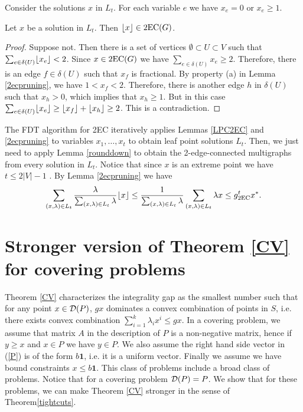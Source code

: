 \documentclass[runningheads]{llncs}
\begin{document}
Consider the solutions $x$ in $L_t$. For each variable $e$ we have $x_e=0$ or $x_e\geq 1$. 
\begin{lemma}\label{rounddown}
	Let $x$ be a solution in $L_t$. Then $\lfloor x\rfloor \in \operatorname{2EC}(G)$. 
\end{lemma}
\begin{proof}
	Suppose not. Then there is a set of vertices $\emptyset \subset U \subset V$ such that $\sum_{e\in \delta(U)}\lfloor x_e\rfloor<2$. Since $x\in \operatorname{2EC}(G)$ we have $\sum_{e\in \delta(U)}x_e \geq 2$. Therefore, there is an edge $f\in \delta(U)$ such that $x_f$ is fractional. By property (a) in Lemma \ref{2ecpruning}, we have $1<  x_f < 2$. Therefore, there is another edge $h$ in $\delta(U)$ such that $x_h>0$, which implies that $x_h\geq 1$. But in this case $\sum_{e\in \delta(U)}\lfloor x_e\rfloor\geq  \lfloor x_f\rfloor+\lfloor x_h\rfloor  \geq 2$. This is a contradiction.
\end{proof}

The FDT algorithm for 2EC iteratively applies Lemmas \ref{LPC2EC} and \ref{2ecpruning} to variables $x_1,\ldots,x_t$ to obtain leaf point solutions $L_t$. Then, we just need to apply Lemma \ref{rounddown} to obtain the 2-edge-connected multigraphs from every solution in $L_t$. Notice that since $x$ is an extreme point we have $t\leq 2|V|-1$ \cite{gerard}. By Lemma \ref{2ecpruning} we have
\begin{align*}
	\sum_{(x,\lambda)\in L_t} \frac{\lambda}{\sum_{(x,\lambda)\in L_t}\lambda} \lfloor x\rfloor \leq \frac{1}{\sum_{(x,\lambda)\in L_t}\lambda} \sum_{(x,\lambda)\in L_t} \lambda {x} \leq g^t_{\operatorname{2EC}} x^*.
\end{align*}







\section{Stronger version of Theorem \ref{CV} for covering problems} \label{gap}

Theorem \ref{CV} characterizes the integrality gap as the smallest number such that for any point $x\in \operatorname{\mathcal{D}}(P)$, $gx$ dominates a convex combination of points in $S$, i.e. there exists convex combination $\sum_{i=1}^{k}\lambda_ix^i \leq gx$.  In a covering problem, we assume that matrix $A$ in the description of $P$ is a non-negative matrix, hence if $y\geq x$ and $x\in P$ we have $y\in P$. We also assume the right hand side vector in (\ref{P}) is of the form $b\textbf{1}$, i.e. it is a uniform vector. Finally we assume we have bound constraints $x\leq b\textbf{1}$. This class of problems include a broad class of problems. Notice that for a covering problem $\operatorname{\mathcal{D}}(P)=P$.  We show that for these problems, we can make Theorem \ref{CV} stronger in the sense of Theorem\ref{tightcuts}.
\end{document}
